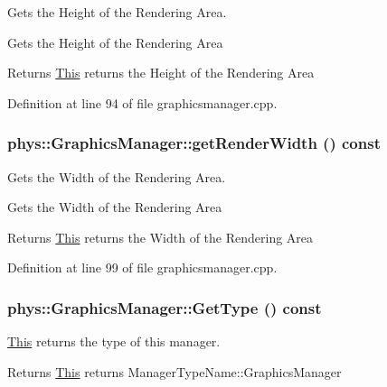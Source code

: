 Gets the Height of the Rendering Area. 

Gets the Height of the Rendering Area \begin{DoxyReturn}{Returns}
\hyperlink{structThis}{This} returns the Height of the Rendering Area 
\end{DoxyReturn}


Definition at line 94 of file graphicsmanager.cpp.

\hypertarget{classphys_1_1GraphicsManager_a9e1ce1f9f8bcff7712fd5beaf7cf2337}{
\subsubsection[{getRenderWidth}]{ phys::GraphicsManager::getRenderWidth () const}}
\label{dd/d63/classphys_1_1GraphicsManager_a9e1ce1f9f8bcff7712fd5beaf7cf2337}


Gets the Width of the Rendering Area. 

Gets the Width of the Rendering Area \begin{DoxyReturn}{Returns}
\hyperlink{structThis}{This} returns the Width of the Rendering Area 
\end{DoxyReturn}


Definition at line 99 of file graphicsmanager.cpp.

\hypertarget{classphys_1_1GraphicsManager_abf48faad2e09cd564442e66bc0473e58}{
\subsubsection[{GetType}]{ phys::GraphicsManager::GetType () const}}
\label{dd/d63/classphys_1_1GraphicsManager_abf48faad2e09cd564442e66bc0473e58}


\hyperlink{structThis}{This} returns the type of this manager. 

\begin{DoxyReturn}{Returns}
\hyperlink{structThis}{This} returns ManagerTypeName::GraphicsManager 
\end{DoxyReturn}


